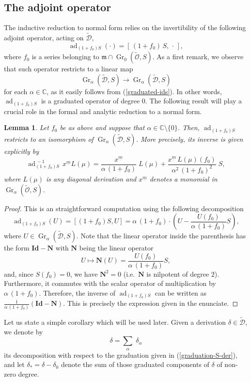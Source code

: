 \documentclass[10pt,twoside,reqno]{amsart}
\newtheorem{lemma}[thm]{Lemma}
\theoremstyle{remark}
\theoremstyle{remark}
\newcommand{\C}{\mathbb{C}}
\newcommand{\um}{{\underline m}}
\newcommand{\ad}{\operatorname{ad}}
\newcommand{\Gr}{\operatorname{Gr}}
\newcommand{\tO}{\widetilde{\mathcal{O}}}
\newcommand{\cD}{\mathcal{D}}
\newcommand{\tcD}{\widetilde{\cD}}
\begin{document}
\subsection{The adjoint operator}
The inductive reduction to normal form relies on the invertibility of the following adjoint operator, acting on $\tcD$,
$$\ad_{(1+f_0) S}(\cdot) = [\,(1+f_0)\, S,\, \cdot\,], $$
where $f_0$ is a series belonging to $\mathfrak{m}\cap \Gr_0(\tO, S)$. As a first remark, we observe that such operator restricts to a linear map
$$
\Gr_\alpha(\tcD, S) \rightarrow \Gr_\alpha(\tcD, S)
$$
for each $\alpha \in \C$, as it easily follows from (\ref{graduated-ids}). In other words, $\ad_{(1+f_0) S}$ is a graduated operator of degree $0$. 
The following result will play a crucial role in the formal and analytic reduction to a normal form.
\begin{lemma}\label{lemma-formula-inverse-adjoint}
Let $f_0$ be as above and suppose that $\alpha \in \C \setminus \{0\}$. Then, $\ad_{(1+f_0) S}$ restricts to an isomorphism of $\Gr_\alpha(\tcD, S)$. More precisely, its inverse is given explicitly by 
$$
\ad_{(1+f_0)S}^{\,-1}\, x^\um L(\mu)  = \frac{x^\um}{\alpha\,(1+f_0)} \; L(\mu) + \frac{x^\um\, L(\mu)(f_0)}{\alpha^2\,(1+f_0)^2}\; S,
$$ 
where $L(\mu)$ is any diagonal derivation and $x^\um$ denotes a monomial in $\Gr_\alpha(\tO, S)$. 
\end{lemma}
\begin{proof}
This is an straightforward computation using the following decomposition 
\[
\ad_{(1+f_0)S}(U) = [(1+f_0)S,U] =  \alpha\,(1+f_0)\cdot \left( U - \frac{U(f_0)}{\alpha\,(1+f_0)} S \right),
\]
where $U \in \Gr_\alpha(\tcD, S)$. Note that the linear operator inside the parenthesis has the form $\mathbf{Id} - \mathbf{N}$ with $\mathbf{N}$ being the linear operator
$$
U \mapsto \mathbf{N}(U) = \frac{U(f_0)}{\alpha\,(1+f_0)} S,
$$
and, since $S(f_0) = 0$, we have $\mathbf{N}^2 = 0$ (i.e.~$\mathbf{N}$ is nilpotent of degree $2$). Furthermore, it commutes with the scalar operator of multiplication by $\alpha\, (1+f_0)$. Therefore, the inverse of $\ad_{(1+f_0)S}$ can be written as $\frac{1}{\alpha\,(1+f_0)}(\mathbf{Id} - \mathbf{N})$.  This is precisely the expression given in the enunciate.
\end{proof}
Let us state a simple corollary which will be used later. Given a derivation $\delta \in \tcD$, we denote by 
$$
\delta = \sum_\alpha\; \delta_\alpha
$$
its decomposition with respect to the graduation given in (\ref{graduation-S-der}), and let $\delta_\ast=\delta - \delta_0$ denote the sum of those graduated components of $\delta$ of non-zero degree.  
\end{document}

